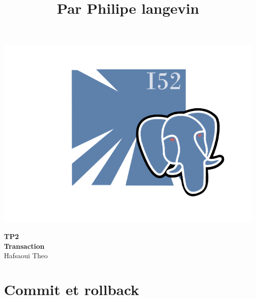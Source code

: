 \documentclass[a4paper,11pt]{article}
\title{\color{OrangeHaf} Par Philipe langevin}
\date{}
\begin{document}
\pagecolor{BlackHaf}
   \noindent\begin{minipage}{0.4\textwidth}%
    \includegraphics[width=\linewidth]{Logotp.png}
    \end{minipage}%
  \hfill%
  \begin{minipage}{0.5\textwidth}\raggedleft
     \textbf{\color{OrangeHaf}\huge TP2 \\Transaction}\\
     Hafsaoui Theo
  \end{minipage}

  \section{\color{LightOrangeHaf}Commit et rollback}
\end{document}
